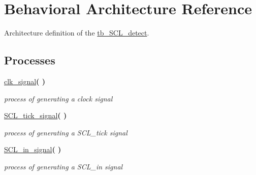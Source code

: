 \hypertarget{classtb___s_c_l__detect_1_1_behavioral}{}\section{Behavioral Architecture Reference}
\label{classtb___s_c_l__detect_1_1_behavioral}


Architecture definition of the \hyperlink{classtb___s_c_l__detect}{tb\+\_\+\+S\+C\+L\+\_\+detect}.  


\subsection*{Processes}
 \begin{DoxyCompactItemize}
\item 
\hyperlink{classtb___s_c_l__detect_1_1_behavioral_a99f3164d142507cc4972fec85ccfe73a}{clk\+\_\+signal}{\bfseries  (  )}\hypertarget{classtb___s_c_l__detect_1_1_behavioral_a99f3164d142507cc4972fec85ccfe73a}{}\label{classtb___s_c_l__detect_1_1_behavioral_a99f3164d142507cc4972fec85ccfe73a}

\begin{DoxyCompactList}\small\item\em process of generating a clock signal \end{DoxyCompactList}\item 
\hyperlink{classtb___s_c_l__detect_1_1_behavioral_a555c43fe3b89360fd2e45fe43b326ef8}{S\+C\+L\+\_\+tick\+\_\+signal}{\bfseries  (  )}\hypertarget{classtb___s_c_l__detect_1_1_behavioral_a555c43fe3b89360fd2e45fe43b326ef8}{}\label{classtb___s_c_l__detect_1_1_behavioral_a555c43fe3b89360fd2e45fe43b326ef8}

\begin{DoxyCompactList}\small\item\em process of generating a S\+C\+L\+\_\+tick signal \end{DoxyCompactList}\item 
\hyperlink{classtb___s_c_l__detect_1_1_behavioral_a548c1354bb219eae313a2ef537ad8357}{S\+C\+L\+\_\+in\+\_\+signal}{\bfseries  (  )}\hypertarget{classtb___s_c_l__detect_1_1_behavioral_a548c1354bb219eae313a2ef537ad8357}{}\label{classtb___s_c_l__detect_1_1_behavioral_a548c1354bb219eae313a2ef537ad8357}

\begin{DoxyCompactList}\small\item\em process of generating a S\+C\+L\+\_\+in signal \end{DoxyCompactList}\end{DoxyCompactItemize}
